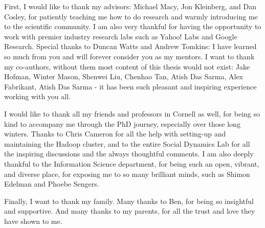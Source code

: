 \documentclass[phd,tocprelim]{cornell}
\begin{document}

\begin{acknowledgements}
First, I would like to thank my advisors: Michael Macy, Jon Kleinberg, and Dan Cosley, for patiently teaching me how to do research and warmly introducing me to the scientific community. I am also very thankful for having the opportunity to work with premier industry research labs such as Yahoo! Labs and Google Research. Special thanks to Duncan Watts and Andrew Tomkins: I have learned so much from you and will forever consider you as my mentors. I want to thank my co-authors, without them most content of this thesis would not exist: Jake Hofman, Winter Mason, Shenwei Liu, Chenhao Tan, Atish Das Sarma, Alex Fabrikant, Atish Das Sarma - it has been such pleasant and inspiring experience working with you all.


I would like to thank all my friends and professors in Cornell as well, for being so kind to accompany me through the PhD journey, especially over those long winters. Thanks to Chris Cameron for all the help with setting-up and maintaining the Hadoop cluster, and to the entire Social Dynamics Lab for all the inspiring discussions and the always thoughtful comments. I am also deeply thankful to the Information Science department, for being such an open, vibrant, and diverse place, for exposing me to so many brilliant minds, such as Shimon Edelman and Phoebe Sengers. 

Finally, I want to thank my family. Many thanks to Ben, for being so insightful and supportive. And many thanks to my parents, for all the trust and love they have shown to me.




\end{acknowledgements}
\end{document}
